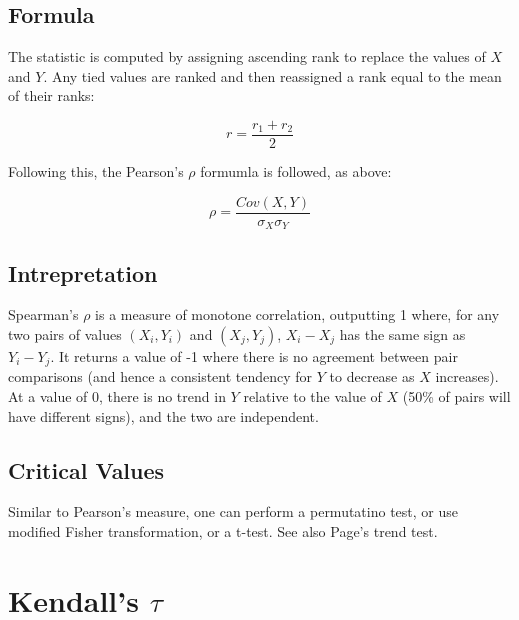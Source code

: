 \documentclass[11pt]{article}
\begin{document}
\subsection{Formula}
The statistic is computed by assigning ascending rank to replace the values of $X$ and $Y$.  Any tied values are ranked and then reassigned a rank equal to the mean of their ranks: 

$$
r = \frac{r_1 + r_2}{2}
$$

Following this, the Pearson's $\rho$ formumla is followed, as above:

$$
\rho = \frac{Cov(X,Y)}{\sigma_X \sigma_Y}
$$


\subsection{Intrepretation}
Spearman's $\rho$ is a measure of monotone correlation, outputting 1 where, for any two pairs of values $(X_i, Y_i)$ and $(X_j, Y_j)$, $X_i - X_j$ has the same sign as $Y_i - Y_j$.  It returns a value of -1 where there is no agreement between pair comparisons (and hence a consistent tendency for $Y$ to decrease as $X$ increases).  At a value of 0, there is no trend in $Y$ relative to the value of $X$ (50\% of pairs will have different signs), and the two are independent.

\subsection{Critical Values}
Similar to Pearson's measure, one can perform a permutatino test, or use modified Fisher transformation, or a t-test.  See also Page's trend test.









\section{Kendall's $\tau$} %
\label{section:kendalltau}
\end{document}
